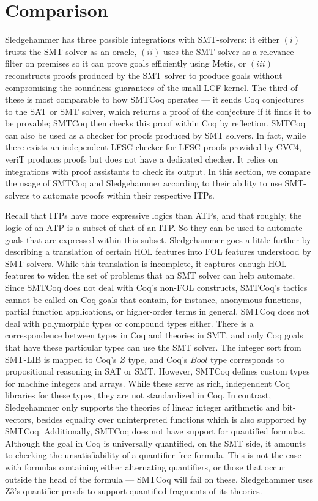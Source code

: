\documentclass{article}
\begin{document}
\section{Comparison}
\label{sec:comp}
	Sledgehammer has three possible integrations with 
	SMT-solvers: it either 
	$(i)$ trusts the SMT-solver as an oracle, 
	$(ii)$ uses the SMT-solver as a relevance filter 
	on premises so it can prove goals efficiently 
	using Metis, or 
	$(iii)$ reconstructs proofs produced by the 
	SMT solver to produce goals without compromising 
	the soundness guarantees of the small LCF-kernel. 
	The third of these is most comparable to how 
	SMTCoq operates --- it sends Coq conjectures to 
	the SAT or SMT solver, which returns a proof of 
	the conjecture if it finds it to be provable; 
	SMTCoq then checks this proof within Coq by 
	reflection. SMTCoq can also be used as a checker 
	for proofs produced by SMT solvers. In fact, 
	while there exists an independent LFSC checker 
	for LFSC proofs provided by CVC4, veriT produces 
	proofs but does not have a dedicated checker. It 
	relies on integrations with proof assistants to 
	check its output. In this section, we compare the 
	usage of SMTCoq and Sledgehammer according to 
	their ability to use SMT-solvers to automate 
	proofs within their respective ITPs.
	
	Recall that ITPs have more expressive logics 
	than ATPs, and that roughly, the logic of an ATP 
	is a subset of that of an ITP. So they can be used 
	to automate goals that are expressed within this 
	subset. Sledgehammer goes a little further by 
	describing a translation of certain HOL 
	features into FOL features understood by SMT 
	solvers. While this translation is incomplete, 
	it captures enough HOL features to widen the set 
	of problems that an SMT solver can help automate. 
	Since SMTCoq does not deal with Coq's non-FOL 
	constructs, SMTCoq's tactics cannot be called 
	on Coq goals that contain, for instance, anonymous 
	functions, partial function applications, or 
	higher-order terms in general. SMTCoq does not deal 
	with polymorphic types or compound types either. 
	There is a correspondence between types in Coq 
	and theories in SMT, and only Coq goals that 
	have these particular types can use the SMT solver. 
	The integer sort from SMT-LIB is mapped to Coq's 
	$Z$ type, and Coq's $Bool$ type 
	corresponds to propositional reasoning in SAT or SMT.
	However, SMTCoq defines custom types 
	for machine integers and arrays. While these serve as 
	rich, independent Coq libraries for these types, 
	they are not standardized in Coq. In contrast,
	Sledgehammer only supports the theories of linear 
	integer arithmetic and bit-vectors, besides equality 
	over uninterpreted functions which is also supported 
	by SMTCoq. Additionally, SMTCoq does not have support 
	for quantified formulas. Although the goal in Coq is universally quantified, on the SMT 
	side, it amounts to checking the unsatisfiability of a quantifier-free formula. This is not the case with 
	formulas containing either alternating quantifiers, or 
	those that occur outside the head of the formula --- 
	SMTCoq will fail on these. Sledgehammer uses Z3's 
	quantifier proofs to support quantified fragments of 
	its theories.
	
\end{document}

